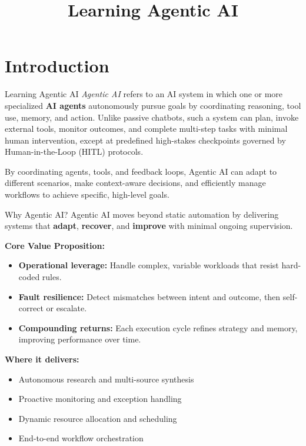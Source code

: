 \documentclass[
11pt,notheorems,hyperref={pdfauthor=whatever}
]{beamer}
\title[Agentic AI]{Learning Agentic AI}
\begin{document}
\section{Introduction}	

\begin{frame}{Learning Agentic AI}
	\textsl{Agentic AI} refers to an AI system in which one or more specialized \textbf{AI agents} autonomously pursue goals by coordinating reasoning, tool use, memory, and action. Unlike passive chatbots, such a system can plan, invoke external tools, monitor outcomes, and complete multi-step tasks with minimal human intervention, except at predefined high-stakes checkpoints governed by Human-in-the-Loop (HITL) protocols.
	
	\vspace*{.9cm}
	
	By coordinating agents, tools, and feedback loops, Agentic AI can adapt to different scenarios, make context-aware decisions, and efficiently manage workflows to achieve specific, high-level goals.
\end{frame}

\begin{frame}{Why Agentic AI?}
	Agentic AI moves beyond static automation by delivering systems that 
	\textbf{adapt}, \textbf{recover}, and \textbf{improve} with minimal ongoing supervision.
	
	\vspace{0.3cm}
	
	\textbf{Core Value Proposition:}
	\begin{itemize}
		\item \textbf{Operational leverage:} Handle complex, variable workloads that resist hard-coded rules.
		\item \textbf{Fault resilience:} Detect mismatches between intent and outcome, then self-correct or escalate.
		\item \textbf{Compounding returns:} Each execution cycle refines strategy and memory, improving performance over time.
	\end{itemize}
	
	\vspace{0.3cm}
	
	\textbf{Where it delivers:}
	\begin{itemize}
		\item Autonomous research and multi-source synthesis
		\item Proactive monitoring and exception handling
		\item Dynamic resource allocation and scheduling
		\item End-to-end workflow orchestration
	\end{itemize}
\end{frame}
\end{document}
